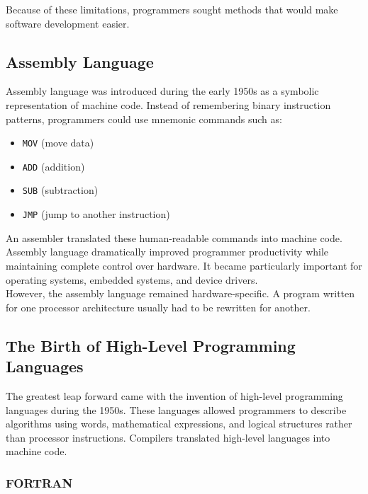 Because of these limitations, programmers sought methods that would make software development easier.\\

\subsection{Assembly Language}

Assembly language was introduced during the early 1950s as a symbolic representation of machine code. Instead of remembering binary instruction patterns, programmers could use mnemonic commands such as:

\begin{itemize}
    \item \texttt{MOV} (move data)
    \item \texttt{ADD} (addition)
    \item \texttt{SUB} (subtraction)
    \item \texttt{JMP} (jump to another instruction)
\end{itemize}

An assembler translated these human-readable commands into machine code.\\

Assembly language dramatically improved programmer productivity while maintaining complete control over hardware. It became particularly important for operating systems, embedded systems, and device drivers.\\

However, the assembly language remained hardware-specific. A program written for one processor architecture usually had to be rewritten for another.\\

\subsection{The Birth of High-Level Programming Languages}

The greatest leap forward came with the invention of high-level programming languages during the 1950s. These languages allowed programmers to describe algorithms using words, mathematical expressions, and logical structures rather than processor instructions. Compilers translated high-level languages into machine code. \\

\subsubsection{FORTRAN}


